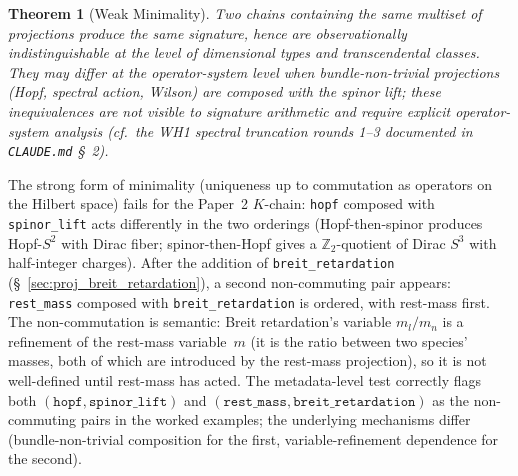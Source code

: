 \documentclass[11pt]{article}
\newtheorem{theorem}{Theorem}
\begin{document}
\begin{theorem}[Weak Minimality]
\label{thm:minimality}
Two chains containing the same multiset of projections produce the
same signature, hence are observationally indistinguishable at the
level of dimensional types and transcendental classes.  They may
differ at the operator-system level when bundle-non-trivial
projections (Hopf, spectral action, Wilson) are composed with the
spinor lift; these inequivalences are not visible to signature
arithmetic and require explicit operator-system analysis (cf.\ the
WH1 spectral truncation rounds 1--3 documented in
\texttt{CLAUDE.md} \S~2).
\end{theorem}

The strong form of minimality (uniqueness up to commutation as
operators on the Hilbert space) fails for the Paper~2 $K$-chain:
\texttt{hopf} composed with \texttt{spinor\_lift} acts differently in
the two orderings (Hopf-then-spinor produces Hopf-$S^2$ with Dirac
fiber; spinor-then-Hopf gives a $\mathbb{Z}_2$-quotient of Dirac
$S^3$ with half-integer charges).  After the addition of
\texttt{breit\_retardation} (\S~\ref{sec:proj_breit_retardation}),
a second non-commuting pair appears:
\texttt{rest\_mass} composed with \texttt{breit\_retardation} is
ordered, with rest-mass first.  The non-commutation is semantic:
Breit retardation's variable $m_l/m_n$ is a refinement of the
rest-mass variable~$m$ (it is the ratio between two species' masses,
both of which are introduced by the rest-mass projection), so it is
not well-defined until rest-mass has acted.  The metadata-level
test correctly flags both
$(\texttt{hopf}, \texttt{spinor\_lift})$ and
$(\texttt{rest\_mass}, \texttt{breit\_retardation})$ as the
non-commuting pairs in the worked examples; the underlying
mechanisms differ
(bundle-non-trivial composition for the first, variable-refinement
dependence for the second).
\end{document}
